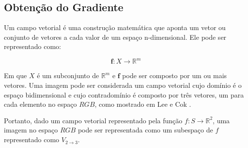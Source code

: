 

\subsection{Obtenção do Gradiente}


Um campo vetorial é uma construção matemática que aponta um vetor ou conjunto de vetores a cada valor de um espaço n-dimensional. Ele pode ser representado como:

$$ \textbf{f}:X \rightarrow \mathbb{R}^m $$

Em que $X$ é um subconjunto de $\mathbb{R}^m$ e $\textbf{f}$ pode ser composto por um ou mais vetores. Uma imagem pode ser considerada um campo vetorial cujo domínio é o espaço bidimensional e cujo contradomínio é composto por três vetores, um para cada elemento no espaço $RGB$, como mostrado em Lee e Cok \cite{borda00}.

Portanto, dado um campo vetorial representado pela função $ f: S \to \mathbb{R}^2 $, uma imagem no espaço $RGB$ pode ser representada como um subespaço de $f$ representado como $ V_{2 \to 3} $.





